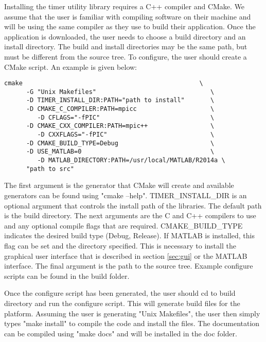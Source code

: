 \documentclass[fleqn,10pt,letterpaper]{article}
\begin{document}
Installing the timer utility library requires a C++ compiler and CMake.  
We assume that the user is familiar with compiling software on their machine
and will be using the same compiler as they use to build their application.
Once the application is downloaded, the user needs to choose a build directory
and an install directory.  The build and install directories may be the same
path, but must be different from the source tree.  To configure, the user should
create a CMake script.  An example is given below:
\begin{Verbatim}[baselinestretch=1.0]
   cmake                                                \
      -G "Unix Makefiles"                               \
      -D TIMER_INSTALL_DIR:PATH="path to install"       \
      -D CMAKE_C_COMPILER:PATH=mpicc                    \
         -D CFLAGS="-fPIC"                              \
      -D CMAKE_CXX_COMPILER:PATH=mpic++                 \
         -D CXXFLAGS="-fPIC"                            \
      -D CMAKE_BUILD_TYPE=Debug                         \
      -D USE_MATLAB=0                                   \
         -D MATLAB_DIRECTORY:PATH=/usr/local/MATLAB/R2014a \
      "path to src"
\end{Verbatim}
The first argument is the generator that CMake will create and available generators
can be found using "cmake --help".  TIMER\_INSTALL\_DIR is an optional argument
that controls the install path of the libraries.  The default path is the build directory.
The next arguments are the C and C++ compilers
to use and any optional compile flags that are required.  CMAKE\_BUILD\_TYPE 
indicates the desired build type (Debug, Release).  If MATLAB is installed,
this flag can be set and the directory specified.  This is necessary to install the 
graphical user interface that is described in section \ref{sec:gui} or the 
MATLAB interface.  The final argument is the path to the source tree.
Example configure scripts can be found in the build folder.

Once the configure script has been generated, the user should cd to build directory
and run the configure script.  This will generate build files for the platform.
Assuming the user is generating "Unix Makefiles", the user then simply types 
"make install" to compile the code and install the files.  The documentation
can be compiled using "make docs" and will be installed in the doc folder.  
\end{document}
